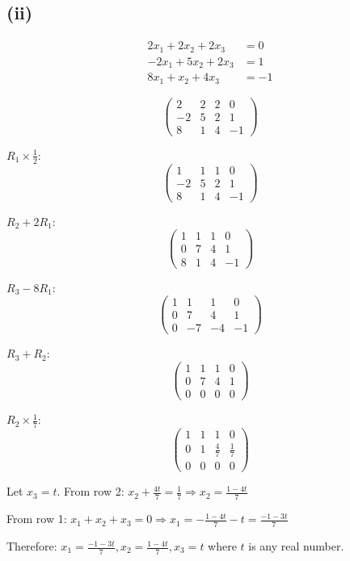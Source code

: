 \subsection*{(ii)}
\begin{align*}
	2x_1 + 2x_2 + 2x_3  & = 0  \\
	-2x_1 + 5x_2 + 2x_3 & = 1  \\
	8x_1 + x_2 + 4x_3   & = -1
\end{align*}

\[
	\left(\begin{array}{ccc|c}
			2  & 2 & 2 & 0  \\
			-2 & 5 & 2 & 1  \\
			8  & 1 & 4 & -1
		\end{array}\right)
\]

$R_1 \times \frac{1}{2}$:
\[
	\left(\begin{array}{ccc|c}
			1  & 1 & 1 & 0  \\
			-2 & 5 & 2 & 1  \\
			8  & 1 & 4 & -1
		\end{array}\right)
\]

$R_2 + 2R_1$:
\[
	\left(\begin{array}{ccc|c}
			1 & 1  & 1  & 0  \\
			0 & 7  & 4  & 1  \\
			8  & 1 & 4 & -1
		\end{array}\right)
\]

$R_3 - 8R_1$:
\[
	\left(\begin{array}{ccc|c}
			1 & 1  & 1  & 0  \\
			0 & 7  & 4  & 1  \\
			0 & -7 & -4 & -1
		\end{array}\right)
\]

$R_3 + R_2$:
\[
	\left(\begin{array}{ccc|c}
			1 & 1 & 1 & 0 \\
			0 & 7 & 4 & 1 \\
			0 & 0 & 0 & 0
		\end{array}\right)
\]

$R_2 \times \frac{1}{7}$:
\[
	\left(\begin{array}{ccc|c}
			1 & 1 & 1           & 0           \\
			0 & 1 & \frac{4}{7} & \frac{1}{7} \\
			0 & 0 & 0           & 0
		\end{array}\right)
\]

Let $x_3 = t$. From row 2: $x_2 + \frac{4t}{7} = \frac{1}{7} \Rightarrow x_2 = \frac{1-4t}{7}$

From row 1: $x_1 + x_2 + x_3 = 0 \Rightarrow x_1 = -\frac{1-4t}{7} - t = \frac{-1-3t}{7}$

Therefore: $x_1 = \frac{-1-3t}{7}, x_2 = \frac{1-4t}{7}, x_3 = t$ where $t$ is any real number.